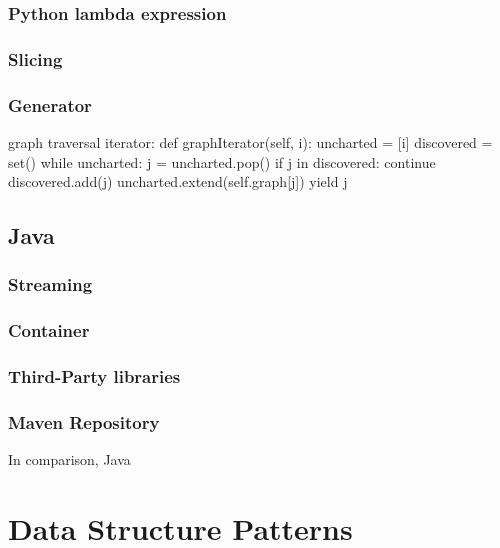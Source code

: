 \documentclass[oneside,11pt]{book}
\theoremstyle{definition}
\theoremstyle{remark}
\newcommand{\java}{Java }
\begin{document}
\subsection{Python lambda expression}\label{subsec:pythonLambdaExpression}
\subsection{Slicing}\label{subsec:slicing}
\subsection{Generator}\label{subsec:generator}




graph traversal iterator:
    def graphIterator(self, i):
        uncharted = [i]
        discovered = set()
        while uncharted:
            j = uncharted.pop()
            if j in discovered:
                continue
            discovered.add(j)
            uncharted.extend(self.graph[j])
            yield j


\section{Java}\label{sec:java}
\subsection{Streaming}\label{subsec:streaming}
\subsection{Container}\label{subsec:container}
\subsection{Third-Party libraries}\label{subsec:third-partyLibraries}
\subsection{Maven Repository}\label{subsec:mavenRepository}

In comparison, \java

\clearpage{}
    \chapter{Data Structure Patterns}\label{ch:datastructure}
    \clearpage{}
\end{document}
